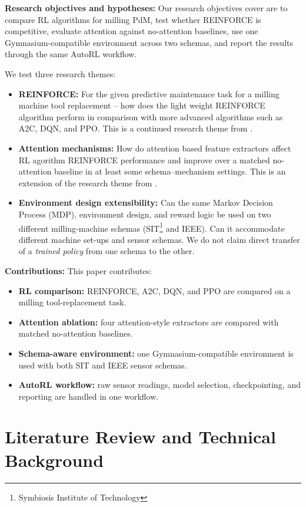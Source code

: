 \documentclass[sn-basic]{sn-jnl}%
\begin{document}
\textbf{Research objectives and hypotheses:}
Our research objectives cover are to compare RL algorithms for milling PdM, test whether \textsc{REINFORCE} is competitive, evaluate attention against no-attention baselines, use one Gymnasium-compatible environment across two schemas, and report the results through the same AutoRL workflow.

We test three research themes:
\begin{itemize}
    \item \textbf{REINFORCE:} For the given predictive maintenance task for a milling machine tool replacement -- how does the light weight \textsc{REINFORCE} algorithm perform in comparison with more advanced algorithms such as \textsc{A2C}, \textsc{DQN}, and \textsc{PPO}. This is a continued research theme from \cite{Siraskar2025}.
    \item \textbf{Attention mechanisms:} How do attention based feature extractors affect RL agorithm \textsc{REINFORCE} performance and improve over a matched no-attention baseline in at least some schema--mechanism settings. This is an extension of the research theme from \cite{Siraskar2024}.
	\item \textbf{Environment design extensibility:} Can the same Markov Decision Process (MDP), environment design, and reward logic be used on two different milling-machine schemas (SIT\footnote{Symbiosis Institute of Technology} and IEEE). Can it accommodate different machine set-ups and sensor schemas. We do not claim direct transfer of a \emph{trained policy} from one schema to the other.
\end{itemize}

\textbf{Contributions:}
This paper contributes:
\begin{itemize}
    \item \textbf{RL comparison:} \textsc{REINFORCE}, \textsc{A2C}, \textsc{DQN}, and \textsc{PPO} are compared on a milling tool-replacement task.
    \item \textbf{Attention ablation:} four attention-style extractors are compared with matched no-attention baselines.
    \item \textbf{Schema-aware environment:} one Gymnasium-compatible environment is used with both SIT and IEEE sensor schemas.
    \item \textbf{AutoRL workflow:} raw sensor readings, model selection, checkpointing, and reporting are handled in one workflow.
\end{itemize}

\section{Literature Review and Technical Background}
\label{sec:lit_tech}
\end{document}
